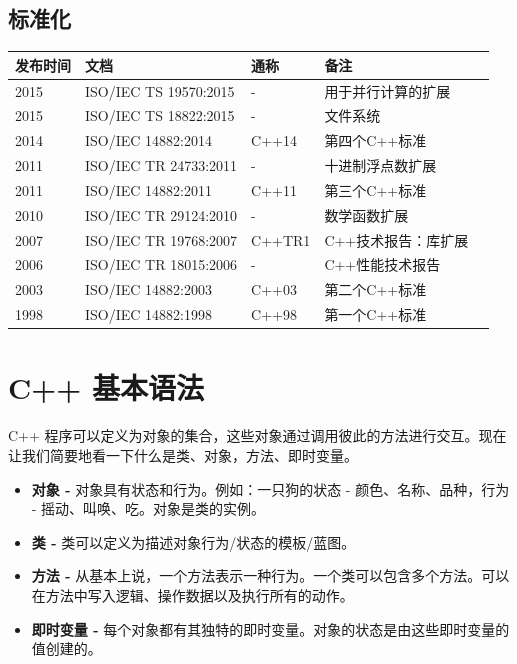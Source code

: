\documentclass[
]{article}
\providecommand{\tightlist}{%
  \setlength{\itemsep}{0pt}\setlength{\parskip}{0pt}}
\begin{document}
\hypertarget{ux6807ux51c6ux5316}{%
\subsection{标准化}\label{ux6807ux51c6ux5316}}

\begin{longtable}[]{@{}lllll@{}}
\toprule
发布时间 & 文档 & 通称 & 备注 & \\
\midrule
\endhead
2015 & ISO/IEC TS 19570:2015 & - & 用于并行计算的扩展 & \\
2015 & ISO/IEC TS 18822:2015 & - & 文件系统 & \\
2014 & ISO/IEC 14882:2014 & C++14 & 第四个C++标准 & \\
2011 & ISO/IEC TR 24733:2011 & - & 十进制浮点数扩展 & \\
2011 & ISO/IEC 14882:2011 & C++11 & 第三个C++标准 & \\
2010 & ISO/IEC TR 29124:2010 & - & 数学函数扩展 & \\
2007 & ISO/IEC TR 19768:2007 & C++TR1 & C++技术报告：库扩展 & \\
2006 & ISO/IEC TR 18015:2006 & - & C++性能技术报告 & \\
2003 & ISO/IEC 14882:2003 & C++03 & 第二个C++标准 & \\
1998 & ISO/IEC 14882:1998 & C++98 & 第一个C++标准 & \\
\bottomrule
\end{longtable}

\hypertarget{c-ux57faux672cux8bedux6cd5}{%
\section{C++ 基本语法}\label{c-ux57faux672cux8bedux6cd5}}

C++
程序可以定义为对象的集合，这些对象通过调用彼此的方法进行交互。现在让我们简要地看一下什么是类、对象，方法、即时变量。

\begin{itemize}
\tightlist
\item
  \textbf{对象 -} 对象具有状态和行为。例如：一只狗的状态 -
  颜色、名称、品种，行为 - 摇动、叫唤、吃。对象是类的实例。
\item
  \textbf{类 -} 类可以定义为描述对象行为/状态的模板/蓝图。
\item
  \textbf{方法 -}
  从基本上说，一个方法表示一种行为。一个类可以包含多个方法。可以在方法中写入逻辑、操作数据以及执行所有的动作。
\item
  \textbf{即时变量 -}
  每个对象都有其独特的即时变量。对象的状态是由这些即时变量的值创建的。
\end{itemize}
\end{document}
